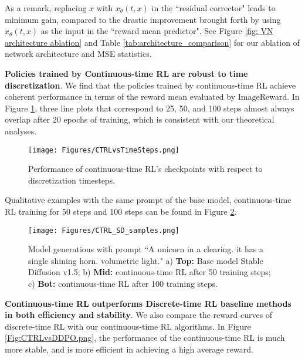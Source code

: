 \documentclass{article}
\theoremstyle{plain}
\theoremstyle{definition}
\theoremstyle{remark}
\begin{document}
As a remark, replacing $x$ with $x_{\theta}(t,x)$ in the ``residual corrector" leads to minimum gain, compared to the drastic improvement brought forth by using $x_{\theta}(t,x)$ as the input in the ``reward mean predictor".
See Figure \ref{fig: VN architecture ablation} and Table \ref{tab:architecture_comparison} for our ablation of network architecture and MSE statistics.

\textbf{Policies trained by Continuous-time RL are robust to time discretization}. 
We find that the policies trained by continuous-time RL achieve coherent performance in terms of the reward mean evaluated by ImageReward. 
In Figure \ref{fig:CTRLvsTimeSteps}, three line plots that correspond to 25, 50, and 100 steps almost always overlap after 20 epochs of training, which is consistent with our theoretical analyses.

\begin{figure}[!htbp]
    \centering
    \texttt{[image: Figures/CTRLvsTimeSteps.png]}
    \caption{Performance of continuous-time RL's checkpoints with respect to discretization timesteps.}
    \label{fig:CTRLvsTimeSteps}
\end{figure}

\vspace{-10 pt}
Qualitative examples with the same prompt of the base model, continuous-time RL training for 50 steps and 100 steps can be found in Figure \ref{Fig:CTRL_SD_sample}.
\begin{figure}[!h]
    \centering
    \texttt{[image: Figures/CTRL\_SD\_samples.png]}
    \caption{Model generations with prompt ``A unicorn in a clearing. it has a single shining horn. volumetric light." \quad a) \textbf{Top:} Base model Stable Diffusion v1.5; b) \textbf{Mid:} continuous-time RL after 50 training steps; c) \textbf{Bot:} continuous-time RL after 100 training steps.}
    \label{Fig:CTRL_SD_sample}
\end{figure}


\textbf{Continuous-time RL outperforms Discrete-time RL baseline methods in both efficiency and stability}. We also compare the reward curves of discrete-time RL with our continuous-time RL algorithms. 
In Figure \ref{Fig:CTRLvsDDPO.png}, the performance of the continuous-time RL is much more stable, and is more efficient in achieving a high average reward.
\end{document}
